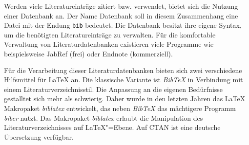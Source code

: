 

Werden viele Literatureinträge zitiert bzw. verwendet, bietet sich die Nutzung
einer Datenbank an. Der Name Datenbank soll in diesem Zusammenhang eine
Datei mit der Endung \lstinline|bib| bedeutet. Die Datenbank besitzt ihre eigene Syntax,
um die benötigten Literatureinträge zu verwalten. Für die komfortable Verwaltung
von Literaturdatenbanken existieren viele Programme wie beispielsweise JabRef (frei) oder
Endnote (kommerziell).

Für die Verarbeitung dieser Literaturdatenbanken bieten sich zwei verschiedene 
Hilfsmittel für \LaTeX{} an. Die klassische Variante ist \emph{Bib\TeX} in Verbindung
mit einem Literaturverzeichnisstil. Die Anpassung an die eigenen Bedürfnisse
gestalltet sich mehr als schwierig. Daher wurde in den letzten Jahren das \LaTeX{} 
Makropaket \emph{biblatex} entwickelt, das neben \emph{Bib\TeX}  das mächtigere
Programm \emph{biber} nutzt. Das Makropaket \emph{biblatex} erlaubt die Manipulation
des Literaturverzeichnisses auf \LaTeX"=Ebene. Auf CTAN ist eine deutsche Übersetzung
verfügbar\cite{biblatex-de}.




